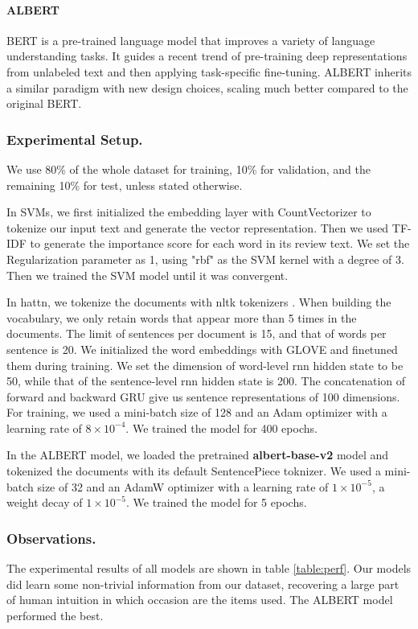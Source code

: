 \documentclass[sigconf]{acmart}
\begin{document}
\paragraph{ALBERT} BERT \cite{devlin2018bert} is a pre-trained language model that improves a variety of language understanding tasks. It guides a recent trend of pre-training deep representations from unlabeled text and then applying task-specific fine-tuning. ALBERT \cite{Lan2020ALBERT} inherits a similar paradigm with new design choices, scaling much better compared to the original BERT. 
\subsubsection{Experimental Setup.} We use 80\% of the whole dataset for training, 10\% for validation, and the remaining 10\% for test, unless stated otherwise.

In SVMs, we first initialized the embedding layer with CountVectorizer to tokenize our input text and generate the vector representation. Then we used TF-IDF to generate the importance score for each word in its review text. We set the Regularization parameter as 1, using "rbf" as the SVM kernel with a degree of 3. Then we trained the SVM model until it was convergent.

In hattn, we tokenize the documents with nltk tokenizers \cite{nltk}. When building the vocabulary, we only retain words that appear more than 5 times in the documents. The limit of sentences per document is 15, and that of words per sentence is 20. We initialized the word embeddings with GLOVE \cite{pennington2014glove} and finetuned them during training.
We set the dimension of word-level rnn hidden state to be 50, while that of the sentence-level rnn hidden state is 200. The concatenation of forward and backward GRU give us sentence representations of 100 dimensions. For training, we used a mini-batch size of 128 and an Adam optimizer with a learning rate of $8 \times 10^{-4}$. We trained the model for 400 epochs.

In the ALBERT model, we loaded the pretrained \textbf{albert-base-v2} model and tokenized the documents with its default SentencePiece toknizer. We used a mini-batch size of 32 and an AdamW optimizer with a learning rate of $1 \times 10^{-5}$, a weight decay of $1\times 10^{-5}$. We trained the model for 5 epochs.

\subsubsection{Observations.} 
The experimental results of all models are shown in table \ref{table:perf}. Our models did learn some non-trivial information from our dataset, recovering a large part of human intuition in which occasion are the items used. The ALBERT model performed the best.
\end{document}

